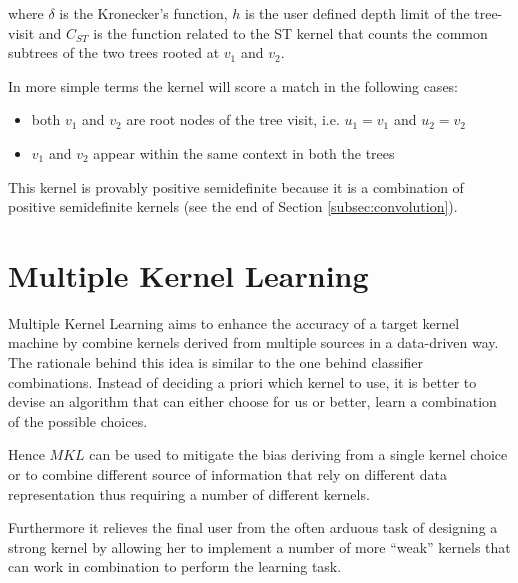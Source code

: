 %

where $\delta$ is the Kronecker's function, $h$ is the user defined depth limit of 
the tree-visit and $C_{ST}$ is the function related to the ST kernel that counts the common
subtrees of the two trees rooted at $v_1$ and $v_2$.

In more simple terms the kernel will score a match in the following cases:
\begin{itemize}
    \item both $v_1$ and $v_2$ are root nodes of the tree visit, i.e. $u_1 = v_1$ and $u_2 = v_2$
    \item $v_1$ and $v_2$ appear within the same context in both the trees
\end{itemize}

This kernel is provably positive semidefinite because it is a combination of positive
semidefinite kernels (see the end of Section \ref{subsec:convolution}).

\section{Multiple Kernel Learning}
\label{subsec:mkl}
Multiple Kernel Learning aims to enhance the accuracy of a target kernel machine
by combine kernels derived from multiple sources in a data-driven way.
The rationale behind this idea is similar to the one behind classifier combinations.
Instead of deciding a priori which kernel to use, it is better to devise an
algorithm that can either choose for us or better, learn a combination of the
possible choices.

Hence $MKL$ can be used to mitigate the bias deriving from a single kernel choice
or to combine different source of information that rely on different data representation
thus requiring a number of different kernels.

Furthermore it relieves the final user from the often arduous task of designing
a strong kernel by allowing her to implement a number of more ``weak'' kernels
that can work in combination to perform the learning task.

